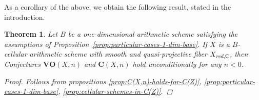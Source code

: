 \documentclass[10pt,a4paper,oneside,draft]{article}
\newcommand{\CC}{\mathbb{C}}
\newcommand{\red}{\text{\it red}}
\theoremstyle{myplain}
\newtheorem{theorem}{Theorem}[section]
\theoremstyle{mydefinition}
\numberwithin{equation}{section}
\begin{document}
As a corollary of the above, we obtain the following result, stated in the
introduction.

\begin{theorem}
  Let $B$ be a one-dimensional arithmetic scheme satisfying the assumptions of
  Proposition~\ref{prop:particular-cases-1-dim-base}. If $X$ is a $B$-cellular
  arithmetic scheme with smooth and quasi-projective fiber $X_{\red,\CC}$, then
  Conjectures $\mathbf{VO} (X,n)$ and $\mathbf{C} (X,n)$ hold unconditionally
  for any $n < 0$.

  \begin{proof}
    Follows from propositions
    \ref{prop:C(X,n)-holds-for-C(Z)},
    \ref{prop:particular-cases-1-dim-base},
    \ref{prop:cellular-schemes-in-C(Z)}.
  \end{proof}
\end{theorem}

\end{document}
